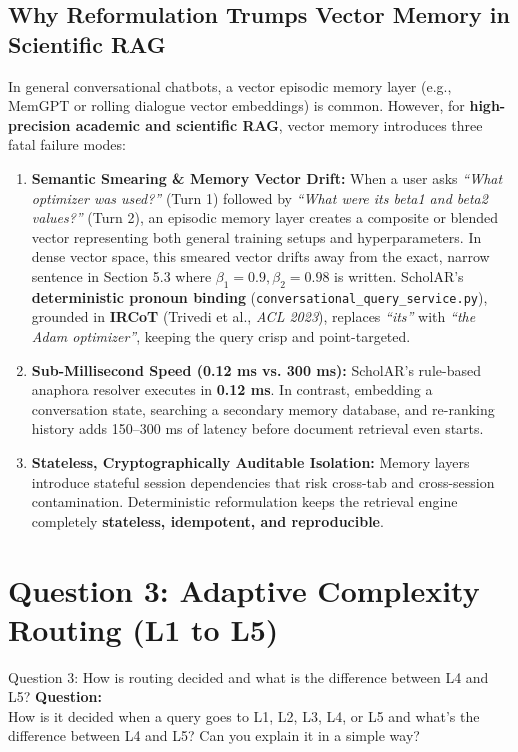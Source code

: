 \documentclass[11pt,a4paper]{article}
\begin{document}
\subsection{Why Reformulation Trumps Vector Memory in Scientific RAG}
In general conversational chatbots, a vector episodic memory layer (e.g., MemGPT or rolling dialogue vector embeddings) is common. However, for \textbf{high-precision academic and scientific RAG}, vector memory introduces three fatal failure modes:

\begin{enumerate}
    \item \textbf{Semantic Smearing \& Memory Vector Drift:}
    When a user asks \textit{``What optimizer was used?''} (Turn 1) followed by \textit{``What were its beta1 and beta2 values?''} (Turn 2), an episodic memory layer creates a composite or blended vector representing both general training setups and hyperparameters. In dense vector space, this smeared vector drifts away from the exact, narrow sentence in Section 5.3 where $\beta_1 = 0.9, \beta_2 = 0.98$ is written. ScholAR's \textbf{deterministic pronoun binding} (\texttt{conversational\_query\_service.py}), grounded in \textbf{IRCoT} (Trivedi et al., \textit{ACL 2023}), replaces \textit{``its''} with \textit{``the Adam optimizer''}, keeping the query crisp and point-targeted.
    \item \textbf{Sub-Millisecond Speed (0.12 ms vs. 300 ms):}
    ScholAR's rule-based anaphora resolver executes in \textbf{0.12 ms}. In contrast, embedding a conversation state, searching a secondary memory database, and re-ranking history adds 150--300 ms of latency before document retrieval even starts.
    \item \textbf{Stateless, Cryptographically Auditable Isolation:}
    Memory layers introduce stateful session dependencies that risk cross-tab and cross-session contamination. Deterministic reformulation keeps the retrieval engine completely \textbf{stateless, idempotent, and reproducible}.
\end{enumerate}

\newpage

\section{Question 3: Adaptive Complexity Routing (L1 to L5)}

\begin{questionbox}{Question 3: How is routing decided and what is the difference between L4 and L5?}
\textbf{Question:}\\
How is it decided when a query goes to L1, L2, L3, L4, or L5 and what's the difference between L4 and L5? Can you explain it in a simple way?
\end{questionbox}
\end{document}
